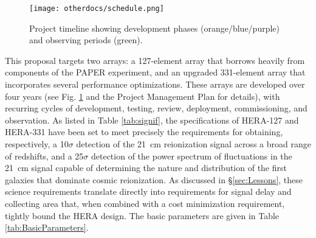 \documentclass[preprint]{aastex}
\newcommand{\Caption}[4]{\vspace{#1}\renewcommand{\baselinestretch}{#2}\caption{#4}\vspace{#3}}
\begin{document}

\begin{figure}[t]\centering
\texttt{[image: otherdocs/schedule.png]}
\Caption{-0.1in}{0.99}{-0.1in}{\small Project timeline showing development phases (orange/blue/purple) and observing periods (green).}
\label{fig:timeline}
\end{figure}

This proposal targets two arrays: a 127-element array that borrows heavily
from components of the PAPER experiment, and an upgraded 331-element array that
incorporates several performance optimizations.  
These arrays are developed over four years (see Fig. \ref{fig:timeline} and the Project Management Plan for details),
with recurring cycles of development, testing, review, deployment, commissioning, and observation.
As listed in Table \ref{tab:signif}, the specifications of HERA-127
and HERA-331 have been set to meet precisely the requirements for obtaining,
respectively, a 10$\sigma$ detection of the 21~cm reionization signal across a broad range of redshifts, and a
25$\sigma$ detection of the power spectrum of fluctuations in the 21~cm signal
capable of determining the nature and distribution of the first galaxies that
dominate cosmic reionization.  
As discussed in
\S\ref{sec:Lessons}, these science requirements translate directly into
requirements for signal delay and collecting area that, when 
combined with a cost minimization requirement, tightly
bound the HERA design.  The basic parameters are given in Table \ref{tab:BasicParameters}.
\end{document}
